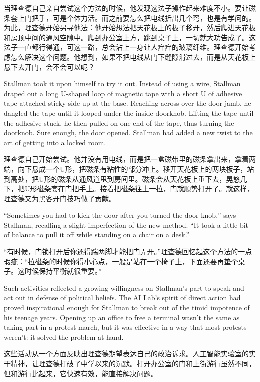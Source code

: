 \ifdefined\chs
当理查德自己亲自尝试这个方法的时候，他发现这法子操作起来难度不小。要让磁条套上门把手，可是个体力活。而之前要怎么把电线折出几个弯，也是有学问的。为此，理查德开始另寻他法：他开始想法把天花板上的板子移开，然后爬进天花板和房顶中间的通风空隙中。爬到办公室上方，跳到桌子上，一切就大功告成了。这法子一直都行得通，可这一路，总会沾上一身让人痒痒的玻璃纤维。理查德开始考虑怎么解决这个问题。他想到，如果不把电线从门下缝隙滑过去，而是从天花板上悬下去开门，会不会可以呢？
\fi

\ifdefined\eng
Stallman took it upon himself to try it out. Instead of using a wire, Stallman draped out a long U-shaped loop of magnetic tape with a short U of adhesive tape attached sticky-side-up at the base. Reaching across over the door jamb, he dangled the tape until it looped under the inside doorknob. Lifting the tape until the adhesive stuck, he then pulled on one end of the tape, thus turning the doorknob. Sure enough, the door opened. Stallman had added a new twist to the art of getting into a locked room.
\fi

\ifdefined\chs
理查德自己开始尝试。他并没有用电线，而是把一盒磁带里的磁条拿出来，拿着两端，向下悬成一个U形，把磁条有粘性的部分冲上。移开天花板上的两块板子，站到高处，把U形的磁条从通风道甩到房间里。磁条会从天花板上垂下去，晃悠几下，把U形磁条套在门把手上。接着把磁条往上一拉，门就顺势打开了。就这样，理查德又为黑客开门技巧做了贡献。
\fi

\ifdefined\eng
``Sometimes you had to kick the door after you turned the door knob,'' says Stallman, recalling a slight imperfection of the new method. ``It took a little bit of balance to pull it off while standing on a chair on a desk.''
\fi

\ifdefined\chs
“有时候，门锁打开后你还得踹两脚才能把门弄开。”理查德回忆起这个方法的一点瑕疵：“拉磁条的时候你得小心点，一般是站在一个椅子上，下面还要再垫个桌子。这时候保持平衡就很重要。”
\fi

\ifdefined\eng
Such activities reflected a growing willingness on Stallman's part to speak and act out in defense of political beliefs. The AI Lab's spirit of direct action had proved inspirational enough for Stallman to break out of the timid impotence of his teenage years. Opening up an office to free a terminal wasn't the same as taking part in a protest march, but it was effective in a way that most protests weren't: it solved the problem at hand.
\fi

\ifdefined\chs
这些活动从一个方面反映出理查德期望表达自己的政治诉求。人工智能实验室的实干精神，让理查德打破了中学以来的沉默。打开办公室的门和上街游行虽然不同，但和游行比起来，它快速有效，能直接解决问题。
\fi

